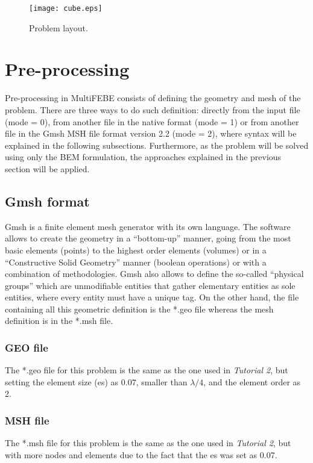 \documentclass[a4]{article}
\begin{document}
\begin{figure}[h]
	\centering
	\texttt{[image: cube.eps]}
	\caption{Problem layout.}
	\label{fig:cube}
\end{figure}

\section{Pre-processing} 
Pre-processing in MultiFEBE consists of defining the geometry and mesh of the problem. There are three ways to do such definition: directly from the input file (mode = 0), from another file in the native format (mode = 1) or from another file in the Gmsh MSH file format version 2.2 (mode = 2), where syntax will be explained in the following subsections. Furthermore, as the problem will be solved using only the BEM formulation, the approaches explained in the previous section will be applied.      

\subsection{Gmsh format}
Gmsh \cite{gmsh, gmshweb} is a finite element mesh generator with its own language. The software allows to create the geometry in a “bottom-up” manner, going from the most basic elements (points) to the highest order elements (volumes) or in a “Constructive Solid Geometry” manner (boolean operations) or with a combination of methodologies. Gmsh also allows to define  the so-called “physical groups” which are unmodifiable entities that gather elementary entities as sole entities, where every entity must have a unique tag. On the other hand, the file containing all this geometric definition is the *.geo file whereas the mesh definition is in the *.msh file. 

\subsubsection{GEO file}
The *.geo file for this problem is the same as the one used in \emph{Tutorial 2}, but setting the element size (es) as 0.07, smaller than $\lambda/4$, and the element order as 2.

\subsubsection{MSH file}
The *.msh file for this problem is the same as the one used in \emph{Tutorial 2}, but with more nodes and elements due to the fact that the es was set as 0.07.
\end{document}
